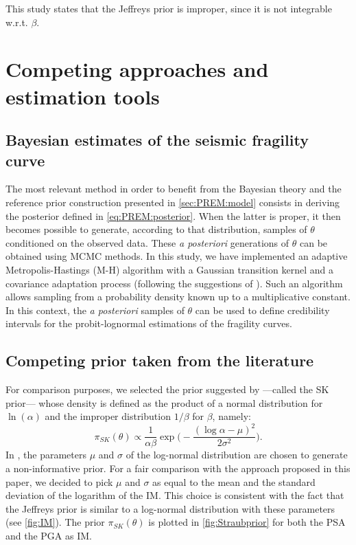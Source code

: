 This study states that the Jeffreys prior is improper, since it is not integrable w.r.t. $\beta$.


\section{Competing approaches and estimation tools}\label{sec:PREM:competing}



    \subsection{Bayesian estimates of the seismic fragility curve}


    The most relevant method in order to benefit from the Bayesian theory and the reference prior construction presented in \cref{sec:PREM:model} consists in deriving the posterior defined in \cref{eq:PREM:posterior}.
    When the latter is proper, it then becomes possible to generate, according to that distribution, samples of $\theta$ conditioned on the observed data. These \emph{a posteriori} generations of $\theta$ can be obtained using MCMC methods. In this study, we have implemented an adaptive Metropolis-Hastings (M-H) algorithm with a Gaussian transition kernel and a covariance adaptation process (following the suggestions of \cite{haario_adaptive_2001}). Such an algorithm allows sampling from a probability density known up to a multiplicative constant. In this context, the \emph{a posteriori} samples of $\theta$ can be used to define credibility intervals for the probit-lognormal estimations of the fragility curves.



    \subsection{Competing prior taken from the literature}

    {For comparison purposes, we selected the prior} suggested by \citet{straub_improved_2008} ---called the SK prior--- whose density is defined as the product of a normal distribution for $\ln(\alpha)$ and the improper distribution $1/\beta$ for $\beta$, namely:
    \begin{equation}\label{eq:Straubprior}
        \pi_{SK}(\theta)\propto\frac{1}{\alpha\beta} \exp\Big( -\frac{(\log\alpha-\mu)^2}{2\sigma^2}\Big).
    \end{equation}
In \cite{straub_improved_2008}, the parameters $\mu$ and $\sigma$ of the log-normal distribution are chosen to generate a non-informative prior. 
For a fair comparison with the approach proposed in this paper, we decided to pick $\mu$ and $\sigma$ as equal to the mean and the standard deviation of the logarithm of the IM. This choice is consistent with the fact that the Jeffreys prior is similar to a log-normal distribution with these parameters (see \cref{fig:IM}). The prior $\pi_{SK}(\theta)$ is plotted in \cref{fig:Straubprior} for both the PSA and the PGA as IM.

